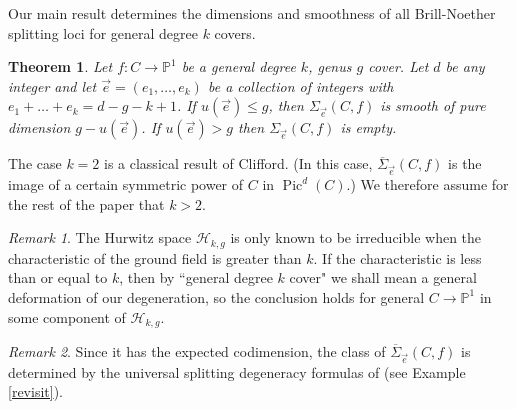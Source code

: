 \documentclass[12pt]{amsart}
\newtheorem{theorem}{Theorem}[section]
\newcommand{\pp}{\mathbb{P}}
\renewcommand{\H}{\mathcal{H}}
\DeclareMathOperator{\Pic}{Pic}
\newcommand{\Sigmabar}{\overline{\Sigma}}
\theoremstyle{definition}
\theoremstyle{remark}
\newtheorem*{remark}{Remark}
\theoremstyle{remark}
\numberwithin{equation}{section}
\begin{document}
Our main result determines the dimensions and smoothness of all Brill-Noether splitting loci for general degree $k$ covers.
\begin{theorem} \label{main}
Let $f\colon  C \rightarrow \pp^1$ be a general degree $k$, genus $g$ cover.
Let $d$ be any integer and let $\vec{e} = (e_1, \ldots, e_k)$ be a collection of integers with $e_1 + \ldots + e_k = d - g - k + 1$.
If $u(\vec{e}) \leq g$, then $\Sigma_{\vec{e}}(C, f)$ is smooth of pure dimension $g - u(\vec{e})$. If $u(\vec{e}) > g$ then $\Sigma_{\vec{e}}(C, f)$ is empty.
\end{theorem}

The case $k = 2$ is a classical result of Clifford. (In this case, $\Sigmabar_{\vec{e}}(C, f)$ is the image of a certain symmetric power of $C$ in $\Pic^d(C)$.) We therefore assume for the rest of the paper that $k > 2$.
\begin{remark}
The Hurwitz space $\H_{k,g}$ is only known to be irreducible when the characteristic of the ground field is greater than $k$. If the characteristic is less than or equal to $k$, then by ``general degree $k$ cover" we shall mean a general deformation of our degeneration, so the conclusion holds for general $C \to \pp^1$ in some component of $\H_{k,g}$.
\end{remark}

\begin{remark}
Since it has the expected codimension, the class of $\Sigmabar_{\vec{e}}(C, f)$ is determined by the universal splitting degeneracy formulas of \cite{L}
 (see  Example \ref{revisit}).
 \end{remark}
\end{document}
